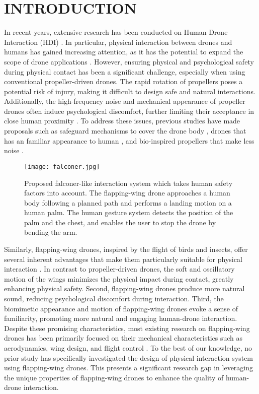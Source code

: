 \section{INTRODUCTION}
In recent years, extensive research has been conducted on Human-Drone Interaction (HDI) \cite{Tezza2019HDI-Survey}.
In particular, physical interaction between drones and humans has gained increasing attention, as it has the potential to expand the scope of drone applications \cite{Knierim2017virtual-reality-tactile-drones, Nitta2014hoverball}. 
However, ensuring physical and psychological safety during physical contact has been a significant challenge, especially when using conventional propeller-driven drones.  
The rapid rotation of propellers poses a potential risk of injury, making it difficult to design safe and natural interactions. 
Additionally, the high-frequency noise and mechanical appearance of propeller drones often induce psychological discomfort, further limiting their acceptance in close human proximity \cite{schaffer2021drone-noise-impact,Yeh2017Proxemics} .
To address these issues, previous studies have made proposals such as 
safeguard mechanisms to cover the drone body \cite{Atahi2017touch-based}, 
drones that has an familiar appearance to human \cite{Yeh2017Proxemics},
and bio-inspired propellers that make less noise \cite{noda2018development-of-low-noise-propeller}.

\begin{figure}
    \centering
    \texttt{[image: falconer.jpg]}
    \caption{Proposed falconer-like interaction system which takes human safety factors into account. 
    The flapping-wing drone approaches a human body following a planned path and performs a landing motion on a human palm.
    The human gesture system detects the position of the palm and the chest, and enables the user to stop the drone by bending the arm.}
    \label{fig:falconer}
\end{figure}

Similarly, flapping-wing drones, inspired by the flight of birds and insects, offer several inherent advantages that make them particularly suitable for physical interaction \cite{de2020flapping}.  
In contrast to propeller-driven drones, the soft and oscillatory motion of the wings minimizes the physical impact during contact, greatly enhancing physical safety.  
Second, flapping-wing drones produce more natural sound, reducing psychological discomfort during interaction.  
Third, the biomimetic appearance and motion of flapping-wing drones evoke a sense of familiarity, promoting more natural and engaging human-drone interaction.  
Despite these promising characteristics, most existing research on flapping-wing drones has been primarily focused on their mechanical characteristics such as aerodynamics, wing design, and flight control \cite{billingsley2021aerodynamic,rifai2008flapping-control,chin2020efficient-flapping}.
To the best of our knowledge, no prior study has specifically investigated the design of physical interaction system using flapping-wing drones.  
This presents a significant research gap in leveraging the unique properties of flapping-wing drones to enhance the quality of human-drone interaction.

